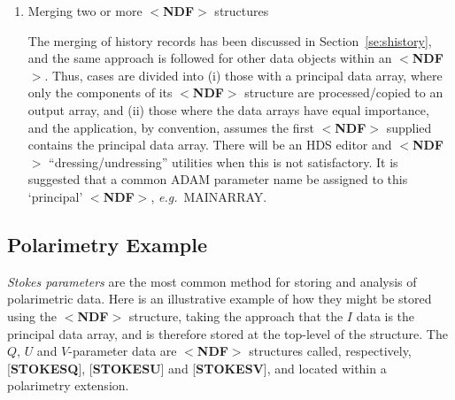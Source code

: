 \documentclass[twoside,11pt]{article}
\newcommand{\htmlref}[2]{#1}
\newenvironment{latexonly}{}{}
\newcommand{\html}[1]{}
\newcommand{\latex}[1]{#1}
\newcommand{\xlabel}[1]{}
\renewcommand{\_}{\texttt{\symbol{95}}}
\begin{document}
\begin{enumerate}
\begin{latexonly}
\begin{tabbing}
\end{tabbing}
\end{latexonly}

\begin{htmlonly}
\begin{quote}

name~~~~~~~~~~special\_type\\
~~~{[}{\bf name1}{]}~~~~~~$<${\bf NDF}$>$ \\
~~~~~~~$\vdots$~~~~~~~~~~~~~~~~~~$\vdots$\- \\
~~~{[}{\bf name2}{]}~~~~~~$<${\bf NDF}$>$ \\
~~~~~~~$\vdots$~~~~~~~~~~~~~~~~~~$\vdots$\- \\
~~~{[}{\bf name3}{]}~~~~~~$<${\bf NDF}$>$ \\
~~~~~~~$\vdots$~~~~~~~~~~~~~~~~~~$\vdots$\- \\

\end{quote}
\end{htmlonly}

Another approach would be to use an HDS array, each
element of which is an NDF.

\item Merging two or more $<${\bf NDF}$>$ structures

The merging of history records has been discussed
in \latex{Section~\ref{se:shistory},}\html{\htmlref{$<${\bf
HISTORY}$>$ Structure,}{se:shistory}} and the same approach
is followed for other data objects within an $<${\bf NDF}$>$.
Thus, cases are divided into (i)
those with a principal data array, where only the
components of its $<${\bf NDF}$>$ structure are
processed/copied to an output array, and
(ii) those where the
data arrays have equal importance, and
the application, by convention, assumes the first $<${\bf NDF}$>$ supplied
contains the
principal data array.  There will be an HDS editor and $<${\bf NDF}$>$
``dressing/undressing'' utilities when this is not satisfactory.  It is
suggested that a common {\small ADAM} parameter name be assigned to this `principal'
$<${\bf NDF}$>$, {\it e.g.}\  MAIN\_ARRAY.
\end{enumerate}

\xlabel{se_expolarimetry}\subsection{Polarimetry Example\label{se:expolarimetry}}

{\it Stokes parameters} are the most common method for storing and analysis
of polarimetric data.  Here is an illustrative
example of how they might be stored
using the $<${\bf NDF}$>$ structure, taking the approach that
the $I$ data is the principal data array, and is therefore
stored at the top-level of the structure.  The $Q$, $U$ and $V$-parameter data
are $<${\bf NDF}$>$ structures called, respectively,
{[}{\bf STOKES\_Q}{]}, {[}{\bf STOKES\_U}{]}
and {[}{\bf STOKES\_V}{]}, and
located within a polarimetry extension.
\end{document}
